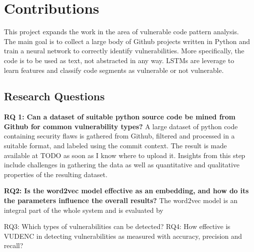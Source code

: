\documentclass[
	a4paper,
	pagesize,
	pdftex,
	12pt,
	twoside, %
	BCOR=5mm, %
	ngerman,
	fleqn,
	final,
	]{scrartcl}
\begin{document}
\section{Contributions}

This project expands the work in the area of vulnerable code pattern analysis. The main goal is to collect a large body of Github projects written in Python and train a neural network to correctly identify vulnerabilities. More specifically, the code is to be used as text, not abstracted in any way. LSTMs are leverage to learn features and classify code segments as vulnerable or not vulnerable. 

\subsection{Research Questions}

\textbf{RQ 1: Can a dataset of suitable python source code be mined from Github for common vulnerability types?}
A large dataset of python code containing security flaws is gathered from Github, filtered and processed in a suitable format, and labeled using the commit context. The result is made available at TODO as soon as I know where to upload it. Insights from this step include challenges in gathering the data as well as quantitative and qualitative properties of the resulting dataset.

\textbf{RQ2: Is the word2vec model effective as an embedding, and how do its the parameters influence the overall results?}
The word2vec model is an integral part of the whole system and is evaluated by 


 RQ3: Which types of vulnerabilities can be detected? RQ4: How effective is VUDENC in detecting vulnerabilities as measured with accuracy, precision and recall? 

\end{document}
